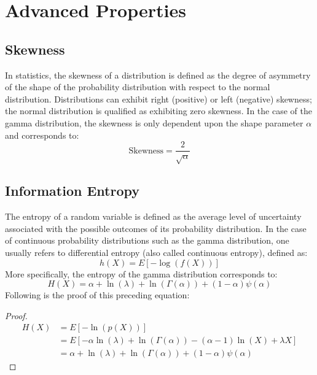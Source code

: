 \documentclass[12pt]{article}
\begin{document}

\pagebreak
\section{Advanced Properties}
\subsection{Skewness}
In statistics, the skewness of a distribution is defined as the degree of asymmetry of the shape of the probability
distribution with respect to the normal distribution. Distributions can exhibit right (positive) or left (negative)
skewness; the normal distribution is qualified as exhibiting zero skewness. In the case of the gamma distribution, the
skewness is only dependent upon the shape parameter $\alpha$ and corresponds to\cite{chenLearnSkewness2021,
wikipediaGammaDistribution2022}:
\begin{equation}
	\text{Skewness} = \frac{2}{\sqrt{\alpha}}
\end{equation}

\subsection{Information Entropy}
The entropy of a random variable is defined as the average level of uncertainty associated with the possible outcomes
of its probability distribution. In the case of continuous probability distributions such as the gamma
distribution, one usually refers to differential entropy (also called continuous entropy), defined
as\cite{wikipediaDifferentialEntropy2022, wikipediaGammaDistribution2022}:
\begin{equation}
	h(X) = E[-\log(f(X))]
\end{equation}
More specifically, the entropy of the gamma distribution corresponds to:
\begin{equation}
	H(X) = \alpha + \ln(\lambda) + \ln(\Gamma(\alpha)) + (1-\alpha)\psi(\alpha)
\end{equation}
Following is the proof of this preceding equation:
\begin{proof}
	\begin{equation}
		\begin{split}
			H(X)	&=	E[-\ln(p(X))]\\
					&=	E[-\alpha\ln(\lambda) + \ln(\Gamma(\alpha)) - (\alpha-1)\ln(X) + \lambda X]\\
					&=	\alpha + \ln(\lambda) + \ln(\Gamma(\alpha)) + (1-\alpha)\psi(\alpha)
		\end{split}
	\end{equation}
\end{proof}
\end{document}
